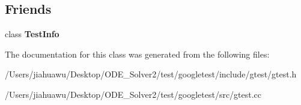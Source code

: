 \subsection*{Friends}
\begin{DoxyCompactItemize}
\item 
\mbox{\label{classtesting_1_1_test_a4c49c2cdb6c328e6b709b4542f23de3c}} 
class {\bfseries Test\+Info}
\end{DoxyCompactItemize}


The documentation for this class was generated from the following files\+:\begin{DoxyCompactItemize}
\item 
/\+Users/jiahuawu/\+Desktop/\+O\+D\+E\+\_\+\+Solver2/test/googletest/include/gtest/gtest.\+h\item 
/\+Users/jiahuawu/\+Desktop/\+O\+D\+E\+\_\+\+Solver2/test/googletest/src/gtest.\+cc\end{DoxyCompactItemize}
